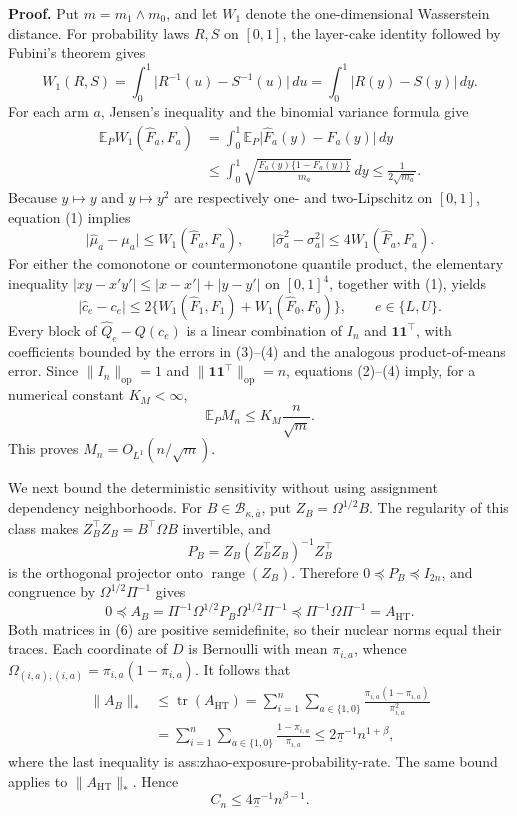 \textbf{Proof.}
Put \(m=m_1\wedge m_0\), and let \(W_1\) denote the one-dimensional Wasserstein distance.  For probability laws \(R,S\) on \([0,1]\), the layer-cake identity followed by Fubini's theorem gives
\[
W_1(R,S)
=\int_0^1\lvert R^{-1}(u)-S^{-1}(u)\rvert\,du
=\int_0^1\lvert R(y)-S(y)\rvert\,dy.
\tag{1}
\]
For each arm \(a\), Jensen's inequality and the binomial variance formula give
\[
\begin{aligned}
\mathbb E_PW_1(\widehat F_a,F_a)
&=\int_0^1\mathbb E_P\lvert\widehat F_a(y)-F_a(y)\rvert\,dy\\
&\le\int_0^1\sqrt{\frac{F_a(y)\{1-F_a(y)\}}{m_a}}\,dy
\le\frac{1}{2\sqrt{m_a}}.
\end{aligned}
\tag{2}
\]
Because \(y\mapsto y\) and \(y\mapsto y^2\) are respectively one- and two-Lipschitz on \([0,1]\), equation (1) implies
\[
\lvert\widehat\mu_a-\mu_a\rvert\le W_1(\widehat F_a,F_a),
\qquad
\lvert\widehat\sigma_a^2-\sigma_a^2\rvert
\le4W_1(\widehat F_a,F_a).
\tag{3}
\]
For either the comonotone or countermonotone quantile product, the elementary inequality \(\lvert xy-x'y'\rvert\le\lvert x-x'\rvert+\lvert y-y'\rvert\) on \([0,1]^4\), together with (1), yields
\[
\lvert\widehat c_e-c_e\rvert
\le2\{W_1(\widehat F_1,F_1)+W_1(\widehat F_0,F_0)\},
\qquad e\in\{L,U\}.
\tag{4}
\]
Every block of \(\widehat Q_e-Q(c_e)\) is a linear combination of \(I_n\) and \(\mathbf1\mathbf1^\top\), with coefficients bounded by the errors in (3)--(4) and the analogous product-of-means error.  Since \(\lVert I_n\rVert_{\mathrm{op}}=1\) and \(\lVert\mathbf1\mathbf1^\top\rVert_{\mathrm{op}}=n\), equations (2)--(4) imply, for a numerical constant \(K_M<\infty\),
\[
\mathbb E_PM_n
\le K_M\frac{n}{\sqrt m}.
\tag{5}
\]
This proves \(M_n=O_{L^1}(n/\sqrt m)\).

We next bound the deterministic sensitivity without using assignment dependency neighborhoods.  For \(B\in\mathcal B_{\kappa,\overline a}\), put \(Z_B=\Omega^{1/2}B\).  The regularity of this class makes \(Z_B^\top Z_B=B^\top\Omega B\) invertible, and
\[
P_B=Z_B(Z_B^\top Z_B)^{-1}Z_B^\top
\]
is the orthogonal projector onto \(\operatorname{range}(Z_B)\).  Therefore \(0\preceq P_B\preceq I_{2n}\), and congruence by \(\Omega^{1/2}\Pi^{-1}\) gives
\[
0\preceq
A_B=\Pi^{-1}\Omega^{1/2}P_B\Omega^{1/2}\Pi^{-1}
\preceq
\Pi^{-1}\Omega\Pi^{-1}=A_{\mathrm{HT}}.
\tag{6}
\]
Both matrices in (6) are positive semidefinite, so their nuclear norms equal their traces.  Each coordinate of \(D\) is Bernoulli with mean \(\pi_{i,a}\), whence \(\Omega_{(i,a),(i,a)}=\pi_{i,a}(1-\pi_{i,a})\).  It follows that
\[
\begin{aligned}
\lVert A_B\rVert_*
&\le\operatorname{tr}(A_{\mathrm{HT}})
=\sum_{i=1}^n\sum_{a\in\{1,0\}}
\frac{\pi_{i,a}(1-\pi_{i,a})}{\pi_{i,a}^2}\\
&=\sum_{i=1}^n\sum_{a\in\{1,0\}}
\frac{1-\pi_{i,a}}{\pi_{i,a}}
\le2\underline\pi^{-1}n^{1+\beta},
\end{aligned}
\tag{7}
\]
where the last inequality is ass:zhao-exposure-probability-rate.  The same bound applies to \(\lVert A_{\mathrm{HT}}\rVert_*\).  Hence
\[
C_n\le4\underline\pi^{-1}n^{\beta-1}.
\tag{8}
\]

